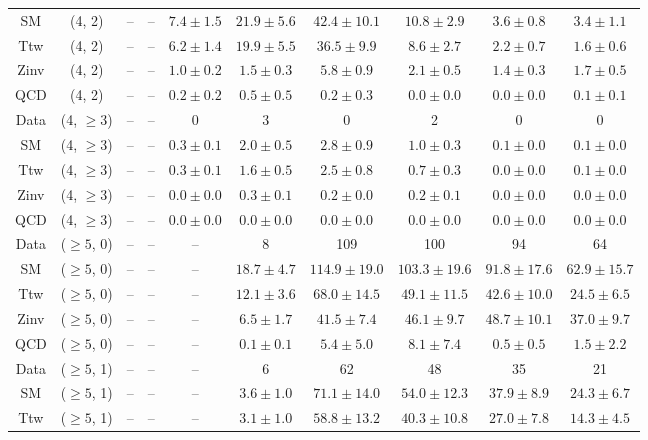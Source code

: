 \begin{table}[h!]
{\begin{tabular}{cccccccccc}
	SM & (4, 2) & -- & -- & $7.4\pm 1.5$ & $21.9\pm 5.6$ & $42.4\pm 10.1$ & $10.8\pm 2.9$ & $3.6\pm 0.8$ & $3.4\pm 1.1$ \\[0.5ex] 
	Ttw & (4, 2) & -- & -- & $6.2\pm 1.4$ & $19.9\pm 5.5$ & $36.5\pm 9.9$ & $8.6\pm 2.7$ & $2.2\pm 0.7$ & $1.6\pm 0.6$ \\[0.5ex] 
	Zinv & (4, 2) & -- & -- & $1.0\pm 0.2$ & $1.5\pm 0.3$ & $5.8\pm 0.9$ & $2.1\pm 0.5$ & $1.4\pm 0.3$ & $1.7\pm 0.5$ \\[0.5ex] 
	QCD & (4, 2) & -- & -- & $0.2\pm 0.2$ & $0.5\pm 0.5$ & $0.2\pm 0.3$ & $0.0\pm 0.0$ & $0.0\pm 0.0$ & $0.1\pm 0.1$ \\[0.5ex] 
	Data & (4, $\ge3$) & -- & -- & 0 & 3 & 0 & 2 & 0 & 0 \\[0.5ex] 
	SM & (4, $\ge3$) & -- & -- & $0.3\pm 0.1$ & $2.0\pm 0.5$ & $2.8\pm 0.9$ & $1.0\pm 0.3$ & $0.1\pm 0.0$ & $0.1\pm 0.0$ \\[0.5ex] 
	Ttw & (4, $\ge3$) & -- & -- & $0.3\pm 0.1$ & $1.6\pm 0.5$ & $2.5\pm 0.8$ & $0.7\pm 0.3$ & $0.0\pm 0.0$ & $0.1\pm 0.0$ \\[0.5ex] 
	Zinv & (4, $\ge3$) & -- & -- & $0.0\pm 0.0$ & $0.3\pm 0.1$ & $0.2\pm 0.0$ & $0.2\pm 0.1$ & $0.0\pm 0.0$ & $0.0\pm 0.0$ \\[0.5ex] 
	QCD & (4, $\ge3$) & -- & -- & $0.0\pm 0.0$ & $0.0\pm 0.0$ & $0.0\pm 0.0$ & $0.0\pm 0.0$ & $0.0\pm 0.0$ & $0.0\pm 0.0$ \\[0.5ex] 
	Data & ($\ge5$, 0) & -- & -- & -- & 8 & 109 & 100 & 94 & 64 \\[0.5ex] 
	SM & ($\ge5$, 0) & -- & -- & -- & $18.7\pm 4.7$ & $114.9\pm 19.0$ & $103.3\pm 19.6$ & $91.8\pm 17.6$ & $62.9\pm 15.7$ \\[0.5ex] 
	Ttw & ($\ge5$, 0) & -- & -- & -- & $12.1\pm 3.6$ & $68.0\pm 14.5$ & $49.1\pm 11.5$ & $42.6\pm 10.0$ & $24.5\pm 6.5$ \\[0.5ex] 
	Zinv & ($\ge5$, 0) & -- & -- & -- & $6.5\pm 1.7$ & $41.5\pm 7.4$ & $46.1\pm 9.7$ & $48.7\pm 10.1$ & $37.0\pm 9.7$ \\[0.5ex] 
	QCD & ($\ge5$, 0) & -- & -- & -- & $0.1\pm 0.1$ & $5.4\pm 5.0$ & $8.1\pm 7.4$ & $0.5\pm 0.5$ & $1.5\pm 2.2$ \\[0.5ex] 
	Data & ($\ge5$, 1) & -- & -- & -- & 6 & 62 & 48 & 35 & 21 \\[0.5ex] 
	SM & ($\ge5$, 1) & -- & -- & -- & $3.6\pm 1.0$ & $71.1\pm 14.0$ & $54.0\pm 12.3$ & $37.9\pm 8.9$ & $24.3\pm 6.7$ \\[0.5ex] 
	Ttw & ($\ge5$, 1) & -- & -- & -- & $3.1\pm 1.0$ & $58.8\pm 13.2$ & $40.3\pm 10.8$ & $27.0\pm 7.8$ & $14.3\pm 4.5$ \\[0.5ex] 

\end{tabular}}
\end{table}
